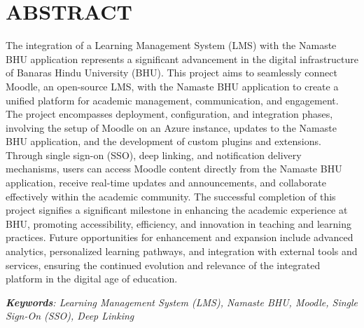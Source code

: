 \newpage
\chapter*{ABSTRACT}

The integration of a Learning Management System (LMS) with the Namaste BHU application represents a significant advancement in the digital infrastructure of Banaras Hindu University (BHU). This project aims to seamlessly connect Moodle, an open-source LMS, with the Namaste BHU application to create a unified platform for academic management, communication, and engagement. The project encompasses deployment, configuration, and integration phases, involving the setup of Moodle on an Azure instance, updates to the Namaste BHU application, and the development of custom plugins and extensions. Through single sign-on (SSO), deep linking, and notification delivery mechanisms, users can access Moodle content directly from the Namaste BHU application, receive real-time updates and announcements, and collaborate effectively within the academic community. The successful completion of this project signifies a significant milestone in enhancing the academic experience at BHU, promoting accessibility, efficiency, and innovation in teaching and learning practices. Future opportunities for enhancement and expansion include advanced analytics, personalized learning pathways, and integration with external tools and services, ensuring the continued evolution and relevance of the integrated platform in the digital age of education.

\emph{\textbf{Keywords}: Learning Management System (LMS), Namaste BHU, Moodle, Single Sign-On (SSO), Deep Linking}
